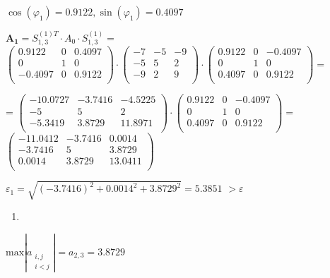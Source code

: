 \documentclass[10pt, a4paper]{scrartcl}
\begin{document}
\(\displaystyle \cos(\varphi_1) = 0.9122, \sin(\varphi_1) = 0.4097\)

\(\displaystyle \mathbf{A_1} = S_{1,3}^{(1)T} \cdot A_0 \cdot S_{1,3}^{(1)} =\)
\(\displaystyle \begin{pmatrix} 0.9122 & 0 & 0.4097\\ 0 & 1 & 0\\ -0.4097 & 0 & 0.9122\\ \end{pmatrix} \cdot \begin{pmatrix} -7 & -5 & -9\\ -5 & 5 & 2\\ -9 & 2 & 9\\ \end{pmatrix} \cdot \begin{pmatrix} 0.9122 & 0 & -0.4097\\ 0 & 1 & 0\\ 0.4097 & 0 & 0.9122\\ \end{pmatrix} =\)

=
\(\displaystyle \begin{pmatrix} -10.0727 & -3.7416 & -4.5225\\ -5 & 5 & 2\\ -5.3419 & 3.8729 & 11.8971\\ \end{pmatrix} \cdot \begin{pmatrix} 0.9122 & 0 & -0.4097\\ 0 & 1 & 0\\ 0.4097 & 0 & 0.9122\\ \end{pmatrix} =\)
\(\displaystyle \begin{pmatrix} -11.0412 & -3.7416 & 0.0014\\ -3.7416 & 5 & 3.8729\\ 0.0014 & 3.8729 & 13.0411\\ \end{pmatrix}\)

\(\displaystyle \varepsilon_1 = \sqrt{(-3.7416)^2 + 0.0014^2 + 3.8729^2 } = \mathbf{5.3851}\)
\(\displaystyle > \varepsilon\)

\begin{enumerate}
\def\labelenumi{\arabic{enumi})}
\setcounter{enumi}{1}
\item
\end{enumerate}

\(\displaystyle \text{max} |a_{\substack{i,j \\ i<j}}| = a_{2,3} = 3.8729\)
\end{document}
